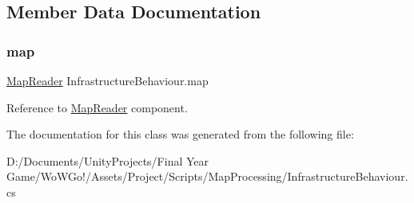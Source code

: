 \subsection{Member Data Documentation}
\mbox{\label{class_infrastructure_behaviour_ab6edad926583d4997971b8ac31346846}} 
\subsubsection{\texorpdfstring{map}{map}}
{\footnotesize\ttfamily \mbox{\hyperlink{class_map_reader}{Map\+Reader}} Infrastructure\+Behaviour.\+map\hspace{0.3cm}{\ttfamily [protected]}}



Reference to \mbox{\hyperlink{class_map_reader}{Map\+Reader}} component. 



The documentation for this class was generated from the following file\+:\begin{DoxyCompactItemize}
\item 
D\+:/\+Documents/\+Unity\+Projects/\+Final Year Game/\+Wo\+W\+Go!/\+Assets/\+Project/\+Scripts/\+Map\+Processing/Infrastructure\+Behaviour.\+cs\end{DoxyCompactItemize}
